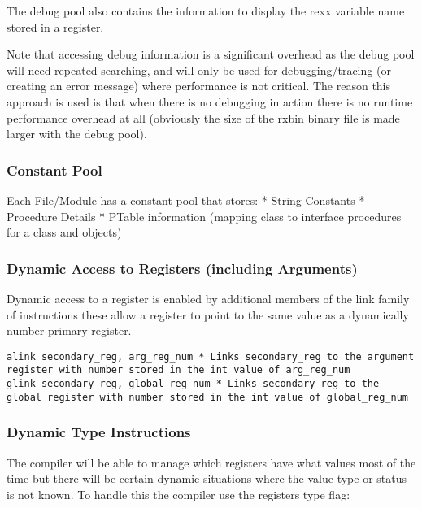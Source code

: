 The debug pool also contains the information to display the rexx
variable name stored in a register.

Note that accessing debug information is a significant overhead as the
debug pool will need repeated searching, and will only be used for
debugging/tracing (or creating an error message) where performance is
not critical. The reason this approach is used is that when there is no
debugging in action there is no runtime performance overhead at all
(obviously the size of the rxbin binary file is made larger with the
debug pool).

\hypertarget{constant-pool}{%
\subsubsection{Constant Pool}\label{constant-pool}}

Each File/Module has a constant pool that stores: * String Constants *
Procedure Details * PTable information (mapping class to interface
procedures for a class and objects)

\hypertarget{dynamic-access-to-registers-including-arguments}{%
\subsubsection{Dynamic Access to Registers (including
Arguments)}\label{dynamic-access-to-registers-including-arguments}}

Dynamic access to a register is enabled by additional members of the
link family of instructions these allow a register to point to the same
value as a dynamically number primary register.

\begin{verbatim}
alink secondary_reg, arg_reg_num * Links secondary_reg to the argument register with number stored in the int value of arg_reg_num 
glink secondary_reg, global_reg_num * Links secondary_reg to the global register with number stored in the int value of global_reg_num 
\end{verbatim}

\hypertarget{dynamic-type-instructions}{%
\subsubsection{Dynamic Type
Instructions}\label{dynamic-type-instructions}}

The compiler will be able to manage which registers have what values
most of the time but there will be certain dynamic situations where the
value type or status is not known. To handle this the compiler use the
registers type flag:

